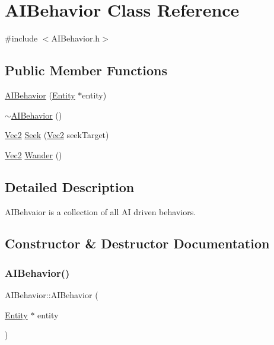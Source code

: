 \hypertarget{class_a_i_behavior}{}\section{A\+I\+Behavior Class Reference}
\label{class_a_i_behavior}


{\ttfamily \#include $<$A\+I\+Behavior.\+h$>$}

\subsection*{Public Member Functions}
\begin{DoxyCompactItemize}
\item 
\mbox{\hyperlink{class_a_i_behavior_a7926fe64414702d698273ecd4a859df4}{A\+I\+Behavior}} (\mbox{\hyperlink{class_entity}{Entity}} $\ast$entity)
\item 
\mbox{\hyperlink{class_a_i_behavior_ae57aaaa9cb072fe0d2c510d63c0c7082}{$\sim$\+A\+I\+Behavior}} ()
\item 
\mbox{\hyperlink{struct_vec2}{Vec2}} \mbox{\hyperlink{class_a_i_behavior_aff36069dc016db7b3c174347e79063c2}{Seek}} (\mbox{\hyperlink{struct_vec2}{Vec2}} seek\+Target)
\item 
\mbox{\hyperlink{struct_vec2}{Vec2}} \mbox{\hyperlink{class_a_i_behavior_a8f2b2c143732f4a23af75c7abbe01978}{Wander}} ()
\end{DoxyCompactItemize}


\subsection{Detailed Description}
A\+I\+Behvaior is a collection of all AI driven behaviors. 

\subsection{Constructor \& Destructor Documentation}
\mbox{\label{class_a_i_behavior_a7926fe64414702d698273ecd4a859df4}} 
\subsubsection{\texorpdfstring{A\+I\+Behavior()}{AIBehavior()}}
{\footnotesize\ttfamily A\+I\+Behavior\+::\+A\+I\+Behavior (\begin{DoxyParamCaption}\item[{\mbox{\hyperlink{class_entity}{Entity}} $\ast$}]{entity }\end{DoxyParamCaption})}

